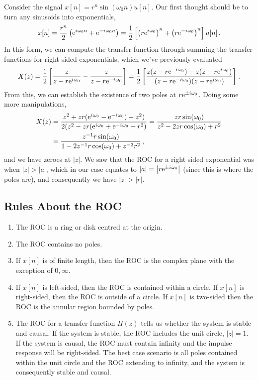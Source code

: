 \begin{exmp}
  Consider the signal $x[n] = r^n\sin(\omega_0 n)u[n]$. Our first thought should be
  to turn any sinusoids into exponentials,
  \begin{displaymath}
    x[n] = \frac{r^n}{2}\left(\mathrm{e}^{{i\mkern1mu} \omega_0n} + \mathrm{e}^{-{i\mkern1mu} \omega_0n}\right) = \frac{1}{2}\left[
      \left(r\mathrm{e}^{{i\mkern1mu}\omega_0}\right)^n + \left(r\mathrm{e}^{-{i\mkern1mu}\omega_0}\right)^n 
    \right] u[n] \,.
  \end{displaymath}
  In this form, we can compute the transfer function through summing
  the transfer functions for right-sided exponentials, which we've previously
  evaluated
  \begin{displaymath}
    X(z) = \frac{1}{2}\left[\frac{z}{z - r\mathrm{e}^{{i\mkern1mu}\omega_0}} - \frac{z}{z - r\mathrm{e}^{-{i\mkern1mu}\omega_0}}\right]
    = \frac{1}{2}\left[\frac{z(z-r\mathrm{e}^{-{i\mkern1mu}\omega_0}) - z(z - r\mathrm{e}^{{i\mkern1mu}\omega_0})}{(z-r\mathrm{e}^{-{i\mkern1mu}\omega_0})(z-r\mathrm{e}^{{i\mkern1mu}\omega_0})}\right] \,.
  \end{displaymath}
  From this, we can establish the existence of two poles at $r\mathrm{e}^{\pm{i\mkern1mu}\omega_0}$.
  Doing some more manipulations,
  \begin{align*}
    X(z) &= \frac{
      z^2 + zr(\mathrm{e}^{{i\mkern1mu}\omega_0} - \mathrm{e}^{-{i\mkern1mu}\omega_0}) - z^2)
    }{
      2(z^2 - zr(\mathrm{e}^{{i\mkern1mu}\omega_0} + \mathrm{e}^{-{i\mkern1mu}\omega_0} + r^2)
    }
    = \frac{zr\sin(\omega_0)}{z^2 - 2zr\cos(\omega_0) + r^2} \\
    &=  \frac{z^{-1}r\sin(\omega_0)}{1 - 2z^{-1}r\cos(\omega_0) + z^{-2}r^2}\,,
  \end{align*}
  and we have zeroes at $|z|$. We saw that the ROC for a right
  sided exponential was when $|z| > |a|$, which in our case equates to
  $|a| = \left|r\mathrm{e}^{\pm {i\mkern1mu}\omega_0}\right|$ (since this is where the poles are),
  and consequently we have $|z| > |r|$.
\end{exmp}

\subsection{Rules About the ROC}
%
\begin{enumerate}
\item The ROC is a ring or disk centred at the origin.
\item The ROC contains no poles.
\item If $x[n]$ is of finite length, then the ROC is the complex
  plane with the exception of $0,\infty$.
\item If $x[n]$ is left-sided, then the ROC is contained within a circle.
  If $x[n]$ is right-sided, then the ROC is outside of a circle. If $x[n]$
  is two-sided then the ROC is the annular region bounded by poles.
\item The ROC for a transfer function $H(z)$ tells us whether the system
  is stable and causal. If the system is stable, the ROC includes the unit
  circle, $|z| = 1$. If the system is causal, the ROC must contain infinity and
  the impulse response will be right-sided. The best case scenario is all poles
  contained within the unit circle and the ROC extending to infinity, and the
  system is consequently stable and causal.
\end{enumerate}
